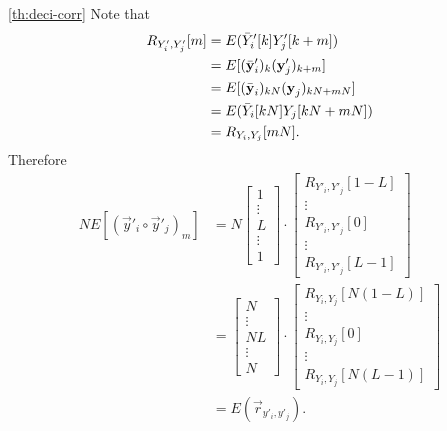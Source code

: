\documentclass[a4paper, openany, oneside]{memoir}
\begin{document}
\begin{blockProofTheorem}{\ref{th:deci-corr}}
    Note that
    \begin{align*}
        R_{Y'_i,Y'_j}[m]
        &= E(\bar{Y}'_i[k]Y'_j[k+m]) \\
        &= E[(\bar{\boldsymbol{\mathbf{y}}}'_i)_{k}(\boldsymbol{\mathbf{y}}'_j)_{k+m}] \\
        &= E[(\bar{\boldsymbol{\mathbf{y}}}_i)_{kN}(\boldsymbol{\mathbf{y}}_j)_{kN+mN}] \\
        &= E(\bar{Y}_i[kN]Y_j[kN+mN]) \\
        &= R_{Y_i,Y_j}[mN].
    \end{align*}
    Therefore
    \begin{align*}
        N E[(\vec{y}'_i \circ \vec{y}'_j)_m]
        &= N\begin{bmatrix}
            1 \\
            \vdots \\
            L \\
            \vdots \\
            1
        \end{bmatrix} \cdot \begin{bmatrix}
            R_{Y'_i,Y'_j}[1-L] \\
            \vdots \\
            R_{Y'_i,Y'_j}[0] \\
            \vdots \\
            R_{Y'_i,Y'_j}[L-1]
        \end{bmatrix} \\
        &= \begin{bmatrix}
            N \\
            \vdots \\
            NL \\
            \vdots \\
            N
        \end{bmatrix} \cdot \begin{bmatrix}
            R_{Y_i,Y_j}[N(1-L)] \\
            \vdots \\
            R_{Y_i,Y_j}[0] \\
            \vdots \\
            R_{Y_i,Y_j}[N(L-1)]
        \end{bmatrix} \\
        &= E(\vec{r}_{y'_i,y'_j}).
    \end{align*}
\end{blockProofTheorem}
\end{document}
